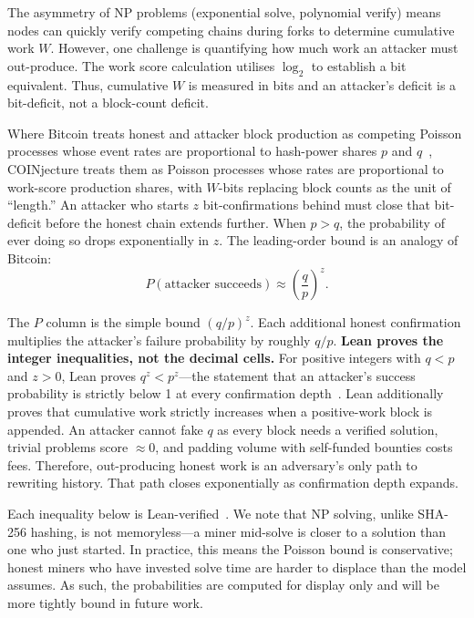 \documentclass[12pt,letterpaper]{article}
\begin{document}
The asymmetry of NP problems (exponential solve, polynomial verify) means nodes can quickly verify
competing chains during forks to determine cumulative work $W$. However, one challenge is quantifying
how much work an attacker must out-produce. The work score calculation utilises $\log_2$ to establish
a bit equivalent. Thus, cumulative $W$ is measured in bits and an attacker's deficit is a bit-deficit,
not a block-count deficit.

Where Bitcoin treats honest and attacker block production as competing Poisson processes whose event
rates are proportional to hash-power shares $p$ and $q$~\cite{nakamoto}, COINjecture treats them as
Poisson processes whose rates are proportional to work-score production shares, with $W$-bits replacing
block counts as the unit of ``length.'' An attacker who starts $z$ bit-confirmations behind must close that
bit-deficit before the honest chain extends further. When $p > q$, the probability of ever doing so drops
exponentially in $z$. The leading-order bound is an analogy of Bitcoin:
\[
  P(\text{attacker succeeds}) \approx \left(\frac{q}{p}\right)^{z}.
\]

The $P$ column is the simple bound $(q/p)^z$. Each additional honest confirmation multiplies the
attacker's failure probability by roughly $q/p$. \textbf{Lean proves the integer inequalities, not the
decimal cells.} For positive integers with $q < p$ and $z > 0$, Lean proves $q^z < p^z$---the statement
that an attacker's success probability is strictly below 1 at every confirmation depth~\cite{security_lean}.
Lean additionally proves that cumulative work strictly increases when a positive-work block is appended.
An attacker cannot fake $q$ as every block needs a verified solution, trivial problems score $\approx 0$,
and padding volume with self-funded bounties costs fees. Therefore, out-producing honest work is an
adversary's only path to rewriting history. That path closes exponentially as confirmation depth expands.

Each inequality below is Lean-verified~\cite{security_lean}. We note that NP solving, unlike SHA-256
hashing, is not memoryless---a miner mid-solve is closer to a solution than one who just started.
In practice, this means the Poisson bound is conservative; honest miners who have invested solve time
are harder to displace than the model assumes. As such, the probabilities are computed for display only
and will be more tightly bound in future work.
\end{document}
